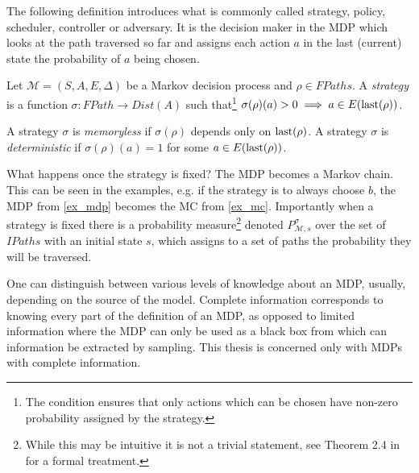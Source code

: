 The following definition introduces what is commonly called strategy,
policy, scheduler, controller or adversary. It is the decision maker in
the MDP which looks at the path traversed so far and assigns each action
$a$ in the last (current) state the probability of $a$ being chosen.

\begin{definition}[Strategy]
    Let $\mathcal{M} = (S,A,E,\Delta)$ be a Markov decision process
    and $\rho \in FPaths$.
    A {\em strategy} is a function
    $\sigma : FPath \to Dist(A)$
    such that\footnote{
The condition ensures that only actions which can
be chosen have non-zero probability assigned by the strategy.}
    $\sigma(\rho)(a) > 0 \implies a \in E(\operatorname{last}(\rho))$.

    A strategy $\sigma$ is {\em memoryless} if $\sigma(\rho)$ depends
    only on $\operatorname{last}(\rho)$. A strategy $\sigma$ is {\em deterministic}
    if $\sigma(\rho)(a) = 1$ for some $a \in E(\operatorname{last}(\rho))$.
\end{definition}

What happens once the strategy is fixed? The MDP becomes a Markov chain.
This can be seen in the examples, e.g. if the strategy is to always
choose $b$, the MDP from \autoref{ex_mdp} becomes the MC from
\autoref{ex_mc}.
Importantly when a strategy is fixed there is a probability
measure\footnote{While this may be intuitive it is not a trivial
statement, see Theorem 2.4 in \parencite{denumerable_mc} for a formal
treatment.} denoted $P^\sigma_{\mathcal{M},s}$ over the set of
$IPaths$ with an initial state $s$, which assigns to a set of paths the
probability they will be traversed.


One can distinguish between various levels of knowledge about an MDP,
usually, depending on the source of the model.
Complete information corresponds to knowing every part of the
definition of an MDP, as opposed to limited information where the MDP
can only be used as a black box from which can information be extracted
by sampling.
This thesis is concerned only with MDPs with complete information.


